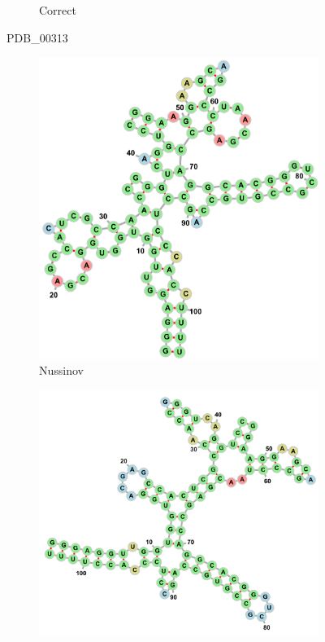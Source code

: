 \documentclass[10pt]{article}
\begin{document}
\begin{figure}[p]
\begin{center}
\begin{subfigure}[b]{0.5\linewidth}
            \caption{Correct}
        \end{subfigure}
    \end{center}
\caption{PDB\_00313}
\label{fig:PDB_00313}
\end{figure}

\begin{figure}[p]
    \begin{subfigure}[b]{0.2\linewidth}
        \includegraphics[width=\linewidth]{./img/SRP_00004_nussinov.png}
        \caption{Nussinov}
    \end{subfigure}
    \begin{subfigure}[b]{0.4\linewidth}
        \includegraphics[width=\linewidth]{./img/SRP_00004_maxstacks.png}

\end{subfigure}
\end{figure}
\end{document}
